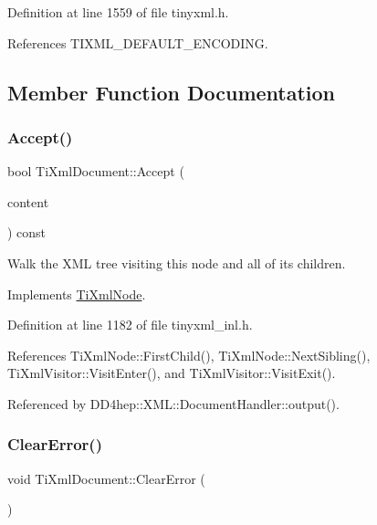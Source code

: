 Definition at line 1559 of file tinyxml.\+h.



References T\+I\+X\+M\+L\+\_\+\+D\+E\+F\+A\+U\+L\+T\+\_\+\+E\+N\+C\+O\+D\+I\+NG.



\subsection{Member Function Documentation}
\hypertarget{class_ti_xml_document_a8ddd6eec722cbd25900bbac664909bac}{}\label{class_ti_xml_document_a8ddd6eec722cbd25900bbac664909bac} 
\subsubsection{\texorpdfstring{Accept()}{Accept()}}
{\footnotesize\ttfamily bool Ti\+Xml\+Document\+::\+Accept (\begin{DoxyParamCaption}\item[{\hyperlink{class_ti_xml_visitor}{Ti\+Xml\+Visitor} $\ast$}]{content }\end{DoxyParamCaption}) const\hspace{0.3cm}{\ttfamily [virtual]}}

Walk the X\+ML tree visiting this node and all of its children. 

Implements \hyperlink{class_ti_xml_node_acc0f88b7462c6cb73809d410a4f5bb86}{Ti\+Xml\+Node}.



Definition at line 1182 of file tinyxml\+\_\+inl.\+h.



References Ti\+Xml\+Node\+::\+First\+Child(), Ti\+Xml\+Node\+::\+Next\+Sibling(), Ti\+Xml\+Visitor\+::\+Visit\+Enter(), and Ti\+Xml\+Visitor\+::\+Visit\+Exit().



Referenced by D\+D4hep\+::\+X\+M\+L\+::\+Document\+Handler\+::output().

\hypertarget{class_ti_xml_document_ac66b8c28db86363315712a3574e87c35}{}\label{class_ti_xml_document_ac66b8c28db86363315712a3574e87c35} 
\subsubsection{\texorpdfstring{Clear\+Error()}{ClearError()}}
{\footnotesize\ttfamily void Ti\+Xml\+Document\+::\+Clear\+Error (\begin{DoxyParamCaption}{ }\end{DoxyParamCaption})\hspace{0.3cm}{\ttfamily [inline]}}

